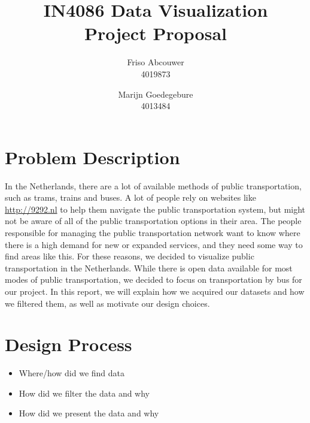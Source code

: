 \documentclass[a4paper,11pt]{article}
\title{IN4086 Data Visualization \\
Project Proposal \\ }
\author{
Friso Abcouwer \\
4019873 \\
\and
Marijn Goedegebure \\
4013484
}
\begin{document}
\maketitle{}
\newpage

\section{Problem Description}
In the Netherlands, there are a lot of available methods of public transportation, such as trams, trains and buses.
A lot of people rely on websites like \url{http://9292.nl} to help them navigate the public transportation system, but might not be aware of all of the public transportation options in their area. The people responsible for managing the public transportation network want to know where there is a high demand for new or expanded services, and they need some way to find areas like this.
For these reasons, we decided to visualize public transportation in the Netherlands. While there is open data available for most modes of public transportation, we decided to focus on transportation by bus for our project. In this report, we will explain how we acquired our datasets and how we filtered them, as well as motivate our design choices.  

\section{Design Process}
\begin{itemize}
\item Where/how did we find data
\item How did we filter the data and why
\item How did we present the data and why
\end{itemize}
\end{document}
